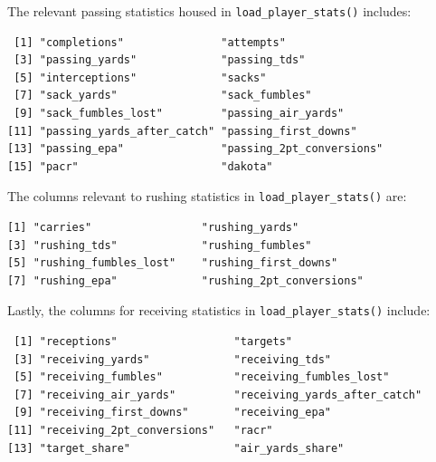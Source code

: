 \documentclass[
  letterpaper,
]{krantz}
\begin{document}
\begin{tcolorbox}[enhanced jigsaw, colback=white, leftrule=.75mm, breakable, colframe=quarto-callout-tip-color-frame, bottomtitle=1mm, rightrule=.15mm, left=2mm, opacityback=0, bottomrule=.15mm, arc=.35mm, coltitle=black, colbacktitle=quarto-callout-tip-color!10!white, toptitle=1mm, titlerule=0mm, title=\textcolor{quarto-callout-tip-color}{\faLightbulb}\hspace{0.5em}{Tip}, toprule=.15mm, opacitybacktitle=0.6]

The relevant passing statistics housed in \texttt{load\_player\_stats()}
includes:

\begin{verbatim}
 [1] "completions"               "attempts"                 
 [3] "passing_yards"             "passing_tds"              
 [5] "interceptions"             "sacks"                    
 [7] "sack_yards"                "sack_fumbles"             
 [9] "sack_fumbles_lost"         "passing_air_yards"        
[11] "passing_yards_after_catch" "passing_first_downs"      
[13] "passing_epa"               "passing_2pt_conversions"  
[15] "pacr"                      "dakota"                   
\end{verbatim}

The columns relevant to rushing statistics in
\texttt{load\_player\_stats()} are:

\begin{verbatim}
[1] "carries"                 "rushing_yards"          
[3] "rushing_tds"             "rushing_fumbles"        
[5] "rushing_fumbles_lost"    "rushing_first_downs"    
[7] "rushing_epa"             "rushing_2pt_conversions"
\end{verbatim}

Lastly, the columns for receiving statistics in
\texttt{load\_player\_stats()} include:

\begin{verbatim}
 [1] "receptions"                  "targets"                    
 [3] "receiving_yards"             "receiving_tds"              
 [5] "receiving_fumbles"           "receiving_fumbles_lost"     
 [7] "receiving_air_yards"         "receiving_yards_after_catch"
 [9] "receiving_first_downs"       "receiving_epa"              
[11] "receiving_2pt_conversions"   "racr"                       
[13] "target_share"                "air_yards_share"            
\end{verbatim}

\end{tcolorbox}
\end{document}
